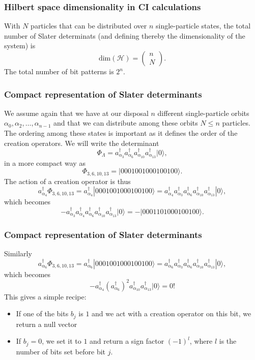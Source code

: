 \documentclass[compress]{beamer}
\newcommand*{\ket}[1]{|#1\rangle}
\begin{document}
\frame
{
  \frametitle{Hilbert space dimensionality in CI calculations}
\begin{small}
{\scriptsize
With $N$ particles that can be distributed over $n$ single-particle states, the total number of Slater determinats (and defining thereby the dimensionality of the system) is
\[
\mathrm{dim}(\mathcal{H}) = \left(\begin{array}{c} n \\N\end{array}\right).
\]
The total number of bit patterns is $2^n$. 
}
\end{small}
}

\frame
{
  \frametitle{Compact representation of Slater determinants}
\begin{small}
{\scriptsize
We assume again that we have at our disposal $n$ different single-particle orbits
$\alpha_0,\alpha_2,\dots,\alpha_{n-1}$ and that we can distribute  among these orbits $N\le n$ particles.
The ordering among these states is important as it defines the order of the creation operators.
We will write the determinant 
\[
\Phi_{\Lambda} = a_{\alpha_3}^\dagger a_{\alpha_6}^\dagger a_{\alpha_{10}}^\dagger a_{\alpha_{13}}^\dagger \ket{0},
\]
in a more compact way as 
\[
\Phi_{3,6,10,13} = |0001001000100100\rangle.
\]
The action of a creation operator is thus
\[
a^\dagger_{\alpha_4}\Phi_{3,6,10,13} = a^\dagger_{\alpha_4}|0001001000100100\rangle=a^\dagger_{\alpha_4}a_{\alpha_3}^\dagger a_{\alpha_6}^\dagger a_{\alpha_{10}}^\dagger a_{\alpha_{13}}^\dagger \ket{0},
\]
which becomes
\[
-a_{\alpha_3}^\dagger a^\dagger_{\alpha_4} a_{\alpha_6}^\dagger a_{\alpha_{10}}^\dagger a_{\alpha_{13}}^\dagger \ket{0}=-|0001101000100100\rangle.
\]
}
\end{small}
}


\frame
{
  \frametitle{Compact representation of Slater determinants}
\begin{small}
{\scriptsize
Similarly
\[
a^\dagger_{\alpha_6}\Phi_{3,6,10,13} = a^\dagger_{\alpha_6}|0001001000100100\rangle=a^\dagger_{\alpha_6}a_{\alpha_3}^\dagger a_{\alpha_6}^\dagger a_{\alpha_{10}}^\dagger a_{\alpha_{13}}^\dagger \ket{0},
\]
which becomes
\[
-a^\dagger_{\alpha_4} (a_{\alpha_6}^\dagger)^ 2 a_{\alpha_{10}}^\dagger a_{\alpha_{13}}^\dagger \ket{0}=0!
\]
This gives a simple recipe:  
\begin{itemize}
\item If one of the bits $b_j$ is $1$ and we act with a creation operator on this bit, we return a null vector
\item  If $b_j=0$, we set it to $1$ and return a sign factor $(-1)^l$, where $l$ is the number of bits set before bit $j$.
\end{itemize}
}
\end{small}
}
\end{document}
